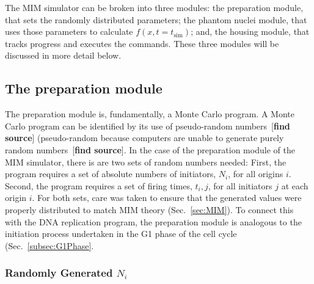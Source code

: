 	The MIM simulator can be broken into three modules: the preparation module, that sets the randomly distributed parameters; the phantom nuclei module, that uses those parameters to calculate $f(x,t=t_\text{sim})$; and, the housing module, that tracks progress and executes the commands.
	These three modules will be discussed in more detail below.
	
	
		\subsection{The preparation module}
		\label{subsec:PrepModule}
		
		The preparation module is, fundamentally, a Monte Carlo program.
		A Monte Carlo program can be identified by its use of pseudo-random numbers~[\textbf{find source}] (pseudo-random because computers are unable to generate purely random numbers~[\textbf{find source}].
		In the case of the preparation module of the MIM simulator, there is are two sets of random numbers needed:
		First, the program requires a set of absolute numbers of initiators, ${N_i}$, for all origins $i$.
		Second, the program requires a set of firing times, $t_i,j$, for all initiators $j$ at each origin $i$.
		For both sets, care was taken to ensure that the generated values were properly distributed to match MIM theory (Sec.~\ref{sec:MIM}).
		To connect this with the DNA replication program, the preparation module is analogous to the initiation process undertaken in the G1 phase of the cell cycle (Sec.~\ref{subsec:G1Phase}.
		
		
			\subsubsection{Randomly Generated $N_i$}
			
